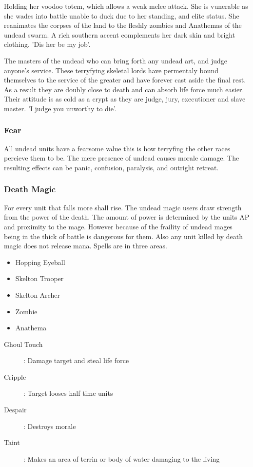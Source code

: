 \documentclass[a4paper,twocolumn]{article}
\begin{document}
Holding her voodoo totem, which allows a weak melee attack. She is vunerable as she wades into battle unable to duck due to her standing, and elite status. She reanimates the corpses of the land to the fleshly zombies and Anathemas of the undead swarm. A rich southern accent complements her dark skin and bright clothing. 'Dis her be my job'.

The masters of the undead who can bring forth any undead art, and judge anyone's service. These terryfying skeletal lords have permentaly bound themselves to the service of the greater and have forever cast aside the final rest. As a result they are doubly close to death and can absorb life force much easier. Their attitude is as cold as a crypt as they are judge, jury, executioner and slave master. 'I judge you unworthy to die'.

\subsubsection{Fear}

All undead units have a fearsome value this is how terryfing the other races percieve them to be. The mere presence of undead causes morale damage. The resulting effects can be panic, confusion, paralysis, and outright retreat.

\subsubsection{Death Magic}

For every unit that falls more shall rise. The undead magic users draw strength from the power of the death. The amount of power is determined by the units AP and proximity to the mage. However because of the fraility of undead mages being in the thick of battle is dangerous for them. Also any unit killed by death magic does not release mana.
Spells are in three areas.

\begin{itemize}
\item Hopping Eyeball
\item Skelton Trooper
\item Skelton Archer
\item Zombie
\item Anathema
\end{itemize}

\begin{description}
\item[Ghoul Touch]: Damage target and steal life force
\item[Cripple]: Target looses half time units
\item[Despair]: Destroys morale
\item[Taint]: Makes an area of terrin or body of water damaging to the living
\end{description}
\end{document}
